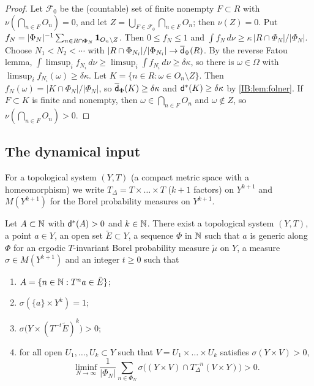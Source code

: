 \begin{proof}
Let $\mathcal F_0$ be the (countable) set of finite nonempty $F\subset R$ with
$\nu(\bigcap_{n\in F}O_n)=0$, and let $Z=\bigcup_{F\in\mathcal F_0}\bigcap_{n\in F}O_n$; then
$\nu(Z)=0$. Put
$f_N=|\Phi_N|^{-1}\sum_{n\in R\cap\Phi_N}\mathbf{1}_{O_n\setminus Z}$. Then $0\le f_N\le 1$
and $\int f_N\,d\nu\ge\kappa\,|R\cap\Phi_N|/|\Phi_N|$. Choose $N_1<N_2<\cdots$ with
$|R\cap\Phi_{N_i}|/|\Phi_{N_i}|\to\overline{\mathsf{d}}_\Phi(R)$. By the reverse Fatou lemma,
$\int\limsup_i f_{N_i}\,d\nu\ge\limsup_i\int f_{N_i}\,d\nu\ge\delta\kappa$, so there is
$\omega\in\Omega$ with $\limsup_i f_{N_i}(\omega)\ge\delta\kappa$. Let $K=\{n\in R: \omega\in O_n\setminus Z\}$.
Then $f_N(\omega)=|K\cap\Phi_N|/|\Phi_N|$, so $\overline{\mathsf{d}}_\Phi(K)\ge\delta\kappa$ and
$\mathsf{d}^*(K)\ge\delta\kappa$ by \cref{IB:lem:folner}. If $F\subset K$ is finite and
nonempty, then $\omega\in\bigcap_{n\in F}O_n$ and $\omega\notin Z$, so
$\nu(\bigcap_{n\in F}O_n)>0$.
\end{proof}

\subsection{The dynamical input}

For a topological system $(Y,T)$ (a compact metric space with a homeomorphism) we
write $T_\Delta=T\times\dots\times T$ ($k+1$ factors) on $Y^{k+1}$ and $M(Y^{k+1})$ for
the Borel probability measures on $Y^{k+1}$.

\begin{proposition}
\label{IB:prop:dyn}
Let $A\subset\mathbb{N}$ with $\mathsf{d}^*(A)>0$ and $k\in\mathbb{N}$. There exist a topological system
$(Y,T)$, a point $a\in Y$, an open set $\tilde E\subset Y$, a \Fol{} sequence $\Phi$
in $\mathbb{N}$ such that $a$ is generic along $\Phi$ for an ergodic $T$-invariant Borel probability
measure $\tilde\mu$ on $Y$, a measure $\sigma\in M(Y^{k+1})$ and an integer $t\ge 0$ such that
\begin{enumerate}[label=\textup{(\roman*)}]
\item\label{IB:dyn1} $A=\{n\in\mathbb{N}: T^na\in\tilde E\}$;
\item\label{IB:dyn2} $\sigma(\{a\}\times Y^k)=1$;
\item\label{IB:dyn3} $\sigma\bigl(Y\times(T^{-t}\tilde E)^k\bigr)>0$;
\item\label{IB:dyn4} for all open $U_1,\dots,U_k\subset Y$ such that
$V=U_1\times\dots\times U_k$ satisfies $\sigma(Y\times V)>0$,
\[
\liminf_{N\to\infty}\frac1{|\Phi_N|}\sum_{n\in\Phi_N}
\sigma\bigl((Y\times V)\cap T_\Delta^{-n}(V\times Y)\bigr)>0 .
\]
\end{enumerate}
\end{proposition}

